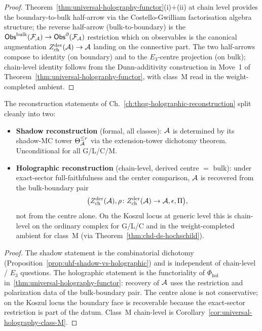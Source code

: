 \begin{proof}
Theorem~\ref{thm:universal-holography-functor}(i)+(ii) at chain
level provides the boundary-to-bulk half-arrow via the
Costello-Gwilliam factorisation algebra structure; the reverse
half-arrow (bulk-to-boundary) is the
$\mathsf{Obs}^{\mathrm{bulk}}(\mathcal{F}_{\mathcal{A}}) \to \mathsf{Obs}^\partial(\mathcal{F}_{\mathcal{A}})$
restriction which on observables is the canonical augmentation
$Z^{\mathrm{der}}_{\mathrm{ch}}(\mathcal{A}) \to \mathcal{A}$ landing on the connective part. The two
half-arrows compose to identity (on boundary) and to the
$E_3$-centre projection (on bulk); chain-level identity follows
from the Dunn-additivity construction in Move~1 of
Theorem~\ref{thm:universal-holography-functor}, with class~M read in
the weight-completed ambient.
\end{proof}

\begin{proposition}
\label{prop:uhf-shadow-vs-holographic}
The reconstruction statements of
Ch.~\ref*{ch:thqg-holographic-reconstruction} split cleanly into
two:
\begin{itemize}
\item \textbf{Shadow reconstruction} \textup{(}formal, all
 classes\textup{)}: $\mathcal{A}$ is determined by its shadow-MC tower
 $\Theta_{\mathcal{A}}^{\leq r}$ via the extension-tower dichotomy
 theorem. Unconditional for all G/L/C/M.
\item \textbf{Holographic reconstruction} \textup{(}chain-level,
 derived centre $=$ bulk\textup{)}: under exact-sector full-faithfulness
 and the center comparison, $\mathcal{A}$ is recovered from the
 bulk-boundary pair
 \[
 \bigl(Z^{\mathrm{der}}_{\mathrm{ch}}(\mathcal{A}),\rho\colon Z^{\mathrm{der}}_{\mathrm{ch}}(\mathcal{A})\to\mathcal{A},\epsilon,\Pi\bigr),
 \]
 not from the centre alone. On the Koszul locus at generic level this is
 chain-level on the ordinary complex for G/L/C and in the
 weight-completed ambient for class~M \textup{(}via
 Theorem~\ref*{thm:chd-ds-hochschild}\textup{)}.
\end{itemize}
\end{proposition}

\begin{proof}
The shadow statement is the combinatorial dichotomy
(Proposition~\ref*{prop:uhf-shadow-vs-holographic}) and is
independent of chain-level / $E_3$ questions. The holographic
statement is the functoriality of $\Phi_{\mathrm{hol}}$
in~\ref{thm:universal-holography-functor}: recovery of $\mathcal{A}$ uses the
restriction and polarization data of the bulk-boundary pair. The centre
alone is not conservative; on the Koszul locus the boundary face is
recoverable because the exact-sector restriction is part of the datum.
Class~M chain-level is
Corollary~\ref*{cor:universal-holography-class-M}.
\end{proof}

